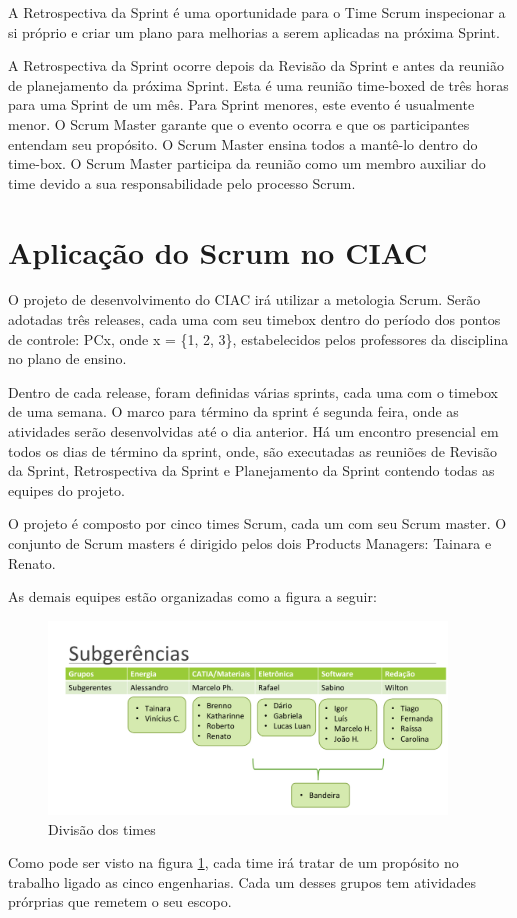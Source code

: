 A Retrospectiva da Sprint é uma oportunidade para o Time Scrum inspecionar a si próprio e
criar um plano para melhorias a serem aplicadas na próxima Sprint.

A Retrospectiva da Sprint ocorre depois da Revisão da Sprint e antes da reunião de
planejamento da próxima Sprint. Esta é uma reunião time-boxed de três horas para uma Sprint
de um mês. Para Sprint menores, este evento é usualmente menor. O Scrum Master garante
que o evento ocorra e que os participantes entendam seu propósito. O Scrum Master ensina
todos a mantê-lo dentro do time-box. O Scrum Master participa da reunião como um membro
auxiliar do time devido a sua responsabilidade pelo processo Scrum.

\section{Aplicação do Scrum no CIAC}
O projeto de desenvolvimento do CIAC irá utilizar a metologia Scrum.
Serão adotadas três releases, cada uma com seu timebox dentro do período dos pontos
de controle: PCx, onde x = \{1, 2, 3\}, estabelecidos pelos professores da disciplina no plano de ensino.

Dentro de cada release, foram definidas várias sprints, cada uma com o timebox
de uma semana. O marco para término da sprint é segunda feira, onde as atividades
serão desenvolvidas até o dia anterior. Há um encontro presencial em todos os dias
de término da sprint, onde, são executadas as reuniões de Revisão da Sprint,
Retrospectiva da Sprint e Planejamento da Sprint contendo todas as equipes
do projeto.

O projeto é composto por cinco times Scrum, cada um com seu Scrum master.
O conjunto de Scrum masters é dirigido pelos dois Products Managers: Tainara e Renato.

As demais equipes estão organizadas como a figura a seguir:
\begin{figure}[h]
  \centering
  \includegraphics[width=400px, scale=1]{figuras/time}
  \caption{Divisão dos times}
\label{fig:time}
\end{figure}
Como pode ser visto na figura \ref{fig:time}, cada time irá tratar de um propósito no trabalho
ligado as cinco engenharias.
Cada um desses grupos tem atividades prórprias que remetem o seu escopo.

